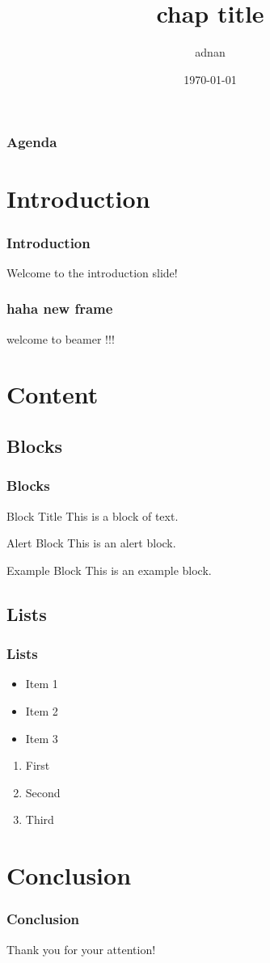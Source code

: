 \documentclass{beamer}
\title{chap title}
\author{adnan}
\date{\today}
\begin{document}
\frame{\titlepage} %

\begin{frame}
\frametitle{Agenda}
\tableofcontents %
\end{frame}

\section{Introduction}
\begin{frame}
\frametitle{Introduction}
Welcome to the introduction slide!
\end{frame}


\begin{frame}
\frametitle{haha new frame}
welcome to beamer !!!
\end{frame}


\section{Content}
\subsection{Blocks}
\begin{frame}
\frametitle{Blocks}
\begin{block}{Block Title}
This is a block of text.
\end{block}

\begin{alertblock}{Alert Block}
This is an alert block.
\end{alertblock}

\begin{exampleblock}{Example Block}
This is an example block.
\end{exampleblock}
\end{frame}

\subsection{Lists}
\begin{frame}
\frametitle{Lists}
\begin{itemize}
    \item Item 1
    \item Item 2
    \item Item 3
\end{itemize}

\begin{enumerate}
    \item First
    \item Second
    \item Third
\end{enumerate}
\end{frame}

\section{Conclusion}
\begin{frame}
\frametitle{Conclusion}
Thank you for your attention!
\end{frame}
\end{document}
